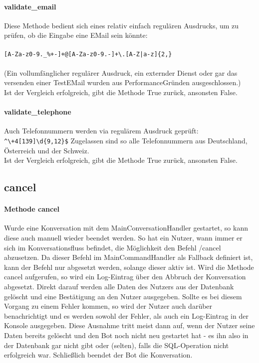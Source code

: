             \paragraph{validate\_email}
                Diese Methode bedient sich eines relativ einfach regulären Ausdrucks, um zu prüfen, ob die Eingabe eine E\-Mail sein könnte: \\
                \\
                \verb/[A-Za-z0-9._%+-]+@[A-Za-z0-9.-]+\.[A-Z|a-z]{2,}/ \\ 
                \\
                (Ein vollumfänglicher regulärer Ausdruck, ein externder Dienst oder gar das versenden einer Test\-E\-Mail wurden aus Performance\-Gründen ausgeschlossen.)\\
                Ist der Vergleich erfolgreich, gibt die Methode True zurück, ansonsten False.

            \paragraph{validate\_telephone}
                Auch Telefonnummern werden via regulärem Ausdruck geprüft: \verb/^\+4[139]\d{9,12}$/
                Zugelassen sind so alle Telefonnummern aus Deutschland, Österreich und der Schweiz.\\
                Ist der Vergleich erfolgreich, gibt die Methode True zurück, ansonsten False.

        
        \subsection{cancel}
            \paragraph{Methode cancel}
                Wurde eine Konversation mit dem Main\-ConversationHandler gestartet, so kann diese auch manuell wieder beendet werden. So hat ein Nutzer, wann immer er sich im Konversationsfluss befindet, die Möglichkeit den Befehl /cancel abzusetzen. Da dieser Befehl im Main\-CommandHandler als Fallback definiert ist, kann der Befehl nur abgesetzt werden, solange dieser aktiv ist. Wird die Methode cancel aufgerufen, so wird ein Log-Eintrag über den Abbruch der Konversation abgesetzt. Direkt darauf werden alle Daten des Nutzers aus der Datenbank gelöscht und eine Bestätigung an den Nutzer ausgegeben. Sollte es bei diesem Vorgang zu einem Fehler kommen, so wird der Nutzer auch darüber benachrichtigt und es werden sowohl der Fehler, als auch ein Log-Eintrag in der Konsole ausgegeben. Diese Ausnahme tritt meist dann auf, wenn der Nutzer seine Daten bereits gelöscht und den Bot noch nicht neu gestartet hat - es ihn also in der Datenbank gar nicht gibt oder (selten), falls die SQL-Operation nicht erfolgreich war.
                Schließlich beendet der Bot die Konversation.


